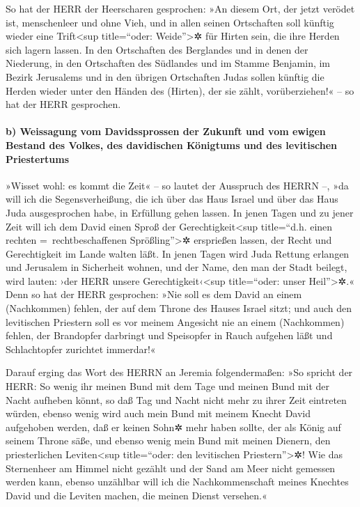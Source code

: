 So hat der HERR der Heerscharen gesprochen: »An diesem
Ort, der jetzt verödet ist, menschenleer und ohne Vieh, und in allen
seinen Ortschaften soll künftig wieder eine Trift\textless sup
title=``oder: Weide''\textgreater✲ für Hirten sein, die ihre Herden sich
lagern lassen. In den Ortschaften des Berglandes und in
denen der Niederung, in den Ortschaften des Südlandes und im Stamme
Benjamin, im Bezirk Jerusalems und in den übrigen Ortschaften Judas
sollen künftig die Herden wieder unter den Händen des (Hirten), der sie
zählt, vorüberziehen!« -- so hat der HERR gesprochen.

\hypertarget{b-weissagung-vom-davidssprossen-der-zukunft-und-vom-ewigen-bestand-des-volkes-des-davidischen-kuxf6nigtums-und-des-levitischen-priestertums}{%
\paragraph{b) Weissagung vom Davidssprossen der Zukunft und vom ewigen
Bestand des Volkes, des davidischen Königtums und des levitischen
Priestertums}\label{b-weissagung-vom-davidssprossen-der-zukunft-und-vom-ewigen-bestand-des-volkes-des-davidischen-kuxf6nigtums-und-des-levitischen-priestertums}}

»Wisset wohl: es kommt die Zeit« -- so lautet der
Ausspruch des HERRN --, »da will ich die Segensverheißung, die ich über
das Haus Israel und über das Haus Juda ausgesprochen habe, in Erfüllung
gehen lassen. In jenen Tagen und zu jener Zeit will ich
dem David einen Sproß der Gerechtigkeit\textless sup title=``d.h. einen
rechten =~rechtbeschaffenen Sprößling''\textgreater✲ ersprießen lassen,
der Recht und Gerechtigkeit im Lande walten läßt. In
jenen Tagen wird Juda Rettung erlangen und Jerusalem in Sicherheit
wohnen, und der Name, den man der Stadt beilegt, wird lauten: ›der HERR
unsere Gerechtigkeit‹\textless sup title=``oder: unser
Heil''\textgreater✲.« Denn so hat der HERR gesprochen:
»Nie soll es dem David an einem (Nachkommen) fehlen, der auf dem Throne
des Hauses Israel sitzt; und auch den levitischen
Priestern soll es vor meinem Angesicht nie an einem (Nachkommen) fehlen,
der Brandopfer darbringt und Speisopfer in Rauch aufgehen läßt und
Schlachtopfer zurichtet immerdar!«

Darauf erging das Wort des HERRN an Jeremia
folgendermaßen: »So spricht der HERR: So wenig ihr meinen
Bund mit dem Tage und meinen Bund mit der Nacht aufheben könnt, so daß
Tag und Nacht nicht mehr zu ihrer Zeit eintreten würden,
ebenso wenig wird auch mein Bund mit meinem Knecht David
aufgehoben werden, daß er keinen Sohn✲ mehr haben sollte, der als König
auf seinem Throne säße, und ebenso wenig mein Bund mit meinen Dienern,
den priesterlichen Leviten\textless sup title=``oder: den levitischen
Priestern''\textgreater✲! Wie das Sternenheer am Himmel
nicht gezählt und der Sand am Meer nicht gemessen werden kann, ebenso
unzählbar will ich die Nachkommenschaft meines Knechtes David und die
Leviten machen, die meinen Dienst versehen.«

